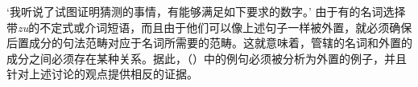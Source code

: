 \glt `我听说了试图证明猜测的事情，有能够满足如下要求的数字。'
\zl
由于有的名词选择带\emph{zu}的不定式或介词短语，而且由于他们可以像上述句子一样被外置，就必须确保后置成分的句法范畴对应于名词所需要的范畴。这就意味着，管辖的名词和外置的成分之间必须存在某种关系。据此，（）中的例句必须被分析为外置的例子，并且针对上述讨论的观点提供相反的证据。 

